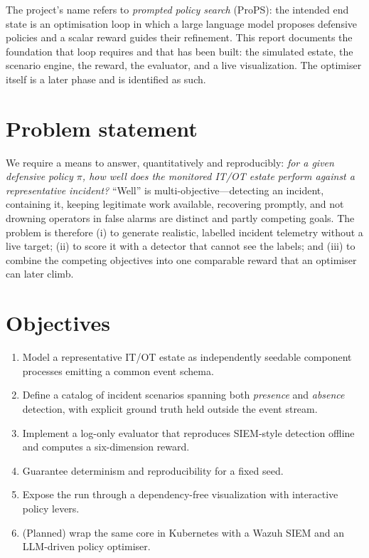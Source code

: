 \documentclass[11pt]{article}
\begin{document}
The project's name refers to \emph{prompted policy search} (ProPS): the intended
end state is an optimisation loop in which a large language model proposes
defensive policies and a scalar reward guides their refinement. This report
documents the foundation that loop requires and that has been built: the
simulated estate, the scenario engine, the reward, the evaluator, and a live
visualization. The optimiser itself is a later phase and is identified as such.

\section{Problem statement}
We require a means to answer, quantitatively and reproducibly: \emph{for a given
defensive policy $\pi$, how well does the monitored IT/OT estate perform against a
representative incident?} ``Well'' is multi-objective---detecting an incident,
containing it, keeping legitimate work available, recovering promptly, and not
drowning operators in false alarms are distinct and partly competing goals. The
problem is therefore (i) to generate realistic, labelled incident telemetry
without a live target; (ii) to score it with a detector that cannot see the
labels; and (iii) to combine the competing objectives into one comparable reward
that an optimiser can later climb.

\section{Objectives}
\begin{enumerate}[leftmargin=1.6em,nosep]
  \item Model a representative IT/OT estate as independently seedable component
        processes emitting a common event schema.
  \item Define a catalog of incident scenarios spanning both \emph{presence} and
        \emph{absence} detection, with explicit ground truth held outside the
        event stream.
  \item Implement a log-only evaluator that reproduces SIEM-style detection
        offline and computes a six-dimension reward.
  \item Guarantee determinism and reproducibility for a fixed seed.
  \item Expose the run through a dependency-free visualization with interactive
        policy levers.
  \item (Planned) wrap the same core in Kubernetes with a Wazuh SIEM and an
        LLM-driven policy optimiser.
\end{enumerate}
\end{document}
